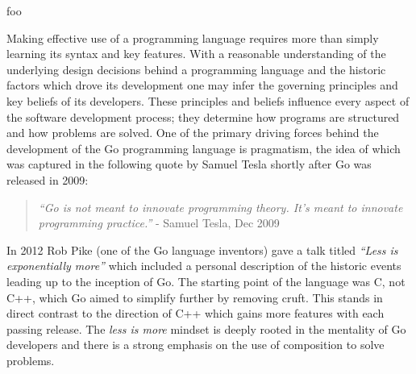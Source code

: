



foo

Making effective use of a programming language requires more than simply learning its syntax and key features. With a reasonable understanding of the underlying design decisions behind a programming language and the historic factors which drove its development one may infer the governing principles and key beliefs of its developers. These principles and beliefs influence every aspect of the software development process; they determine how programs are structured and how problems are solved. One of the primary driving forces behind the development of the Go programming language is pragmatism, the idea of which was captured in the following quote by Samuel Tesla shortly after Go was released in 2009:

\begin{quote}
	\textit{``Go is not meant to innovate programming theory. It's meant to innovate programming practice.''} - Samuel Tesla, Dec 2009 \cite{pragmatic}
\end{quote}

In 2012 Rob Pike (one of the Go language inventors) gave a talk titled \textit{``Less is exponentially more''} which included a personal description of the historic events leading up to the inception of Go. The starting point of the language was C, not C++, which Go aimed to simplify further by removing cruft. This stands in direct contrast to the direction of C++ which gains more features with each passing release. The \textit{less is more} mindset is deeply rooted in the mentality of Go developers and there is a strong emphasis on the use of composition to solve problems.

